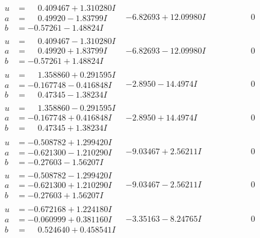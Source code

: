 \documentclass[1p]{elsarticle_modified}
\theoremstyle{definition}
\begin{document}
$$\begin{array}{c|c|c}
\begin{aligned}
u &= \phantom{-}0.409467 + 1.310280 I \\
a &= \phantom{-}0.49920 - 1.83799 I \\
b &= -0.57261 - 1.48824 I\end{aligned}
 & -6.82693 + 12.09980 I & \phantom{-0.000000 } 0 \\ \hline\begin{aligned}
u &= \phantom{-}0.409467 - 1.310280 I \\
a &= \phantom{-}0.49920 + 1.83799 I \\
b &= -0.57261 + 1.48824 I\end{aligned}
 & -6.82693 - 12.09980 I & \phantom{-0.000000 } 0 \\ \hline\begin{aligned}
u &= \phantom{-}1.358860 + 0.291595 I \\
a &= -0.167748 - 0.416848 I \\
b &= \phantom{-}0.47345 - 1.38234 I\end{aligned}
 & -2.8950 - 14.4974 I & \phantom{-0.000000 } 0 \\ \hline\begin{aligned}
u &= \phantom{-}1.358860 - 0.291595 I \\
a &= -0.167748 + 0.416848 I \\
b &= \phantom{-}0.47345 + 1.38234 I\end{aligned}
 & -2.8950 + 14.4974 I & \phantom{-0.000000 } 0 \\ \hline\begin{aligned}
u &= -0.508782 + 1.299420 I \\
a &= -0.621300 - 1.210290 I \\
b &= -0.27603 - 1.56207 I\end{aligned}
 & -9.03467 + 2.56211 I & \phantom{-0.000000 } 0 \\ \hline\begin{aligned}
u &= -0.508782 - 1.299420 I \\
a &= -0.621300 + 1.210290 I \\
b &= -0.27603 + 1.56207 I\end{aligned}
 & -9.03467 - 2.56211 I & \phantom{-0.000000 } 0 \\ \hline\begin{aligned}
u &= -0.672168 + 1.224180 I \\
a &= -0.060999 + 0.381160 I \\
b &= \phantom{-}0.524640 + 0.458541 I\end{aligned}
 & -3.35163 - 8.24765 I & \phantom{-0.000000 } 0 \\ \hline\begin{aligned}

\end{aligned}
\end{array}$$
\end{document}
